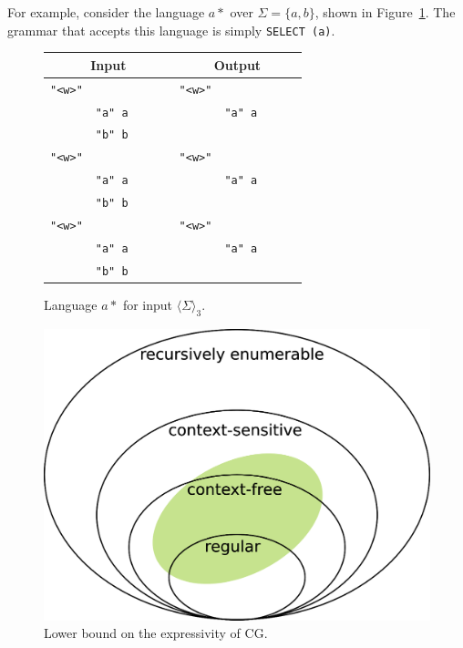 \documentclass[11pt]{article}
\def\t#1{\texttt{#1}}
\def\maxAmb#1{$\langle \Sigma \rangle_#1$}
\begin{document}
For example, consider the language $a*$ over $\Sigma = \{a,b\}$,
shown in Figure~\ref{fig:astar}.
The grammar that accepts this language is simply \texttt{SELECT (a)}.

\def\wwf{\t{"<w>"}}
\def\swf{\t{"<s>"}}
\def\alm{\t{"a" a}~~~~~~}
\def\blm{\t{"b" b}~~~~~~}

\begin{figure}[h]
\centering

\begin{tabular}{cl |  rl}
\multicolumn{2}{c|}{\textbf{Input}} & \multicolumn{2}{c}{\textbf{Output}} \\ \hline

\wwf  &        &  \wwf &        \\
         & \alm  &          & \alm  \\
         & \blm  &          &        \\
\wwf  &        &  \wwf &        \\
         & \alm  &          & \alm  \\
         & \blm  &          &        \\
\wwf  &        &  \wwf &        \\
         & \alm  &          & \alm  \\
         & \blm  &          &        \\
\end{tabular}

\caption{Language $a*$ for input \maxAmb{3}.}
\label{fig:astar}
\end{figure}




\begin{figure}[h]
  \centering
  \includegraphics[width=\linewidth]{chomsky}
  \caption{Lower bound on the expressivity of CG.}
  \label{fig:nocorr}
\end{figure}
\end{document}
